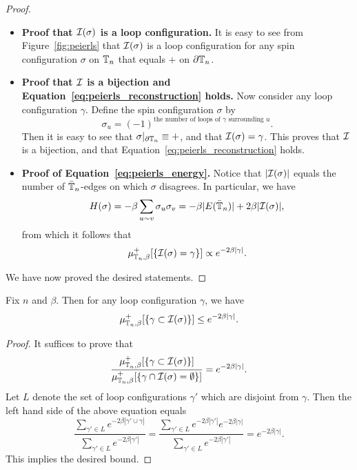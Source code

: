 \begin{proof}
    \begin{itemize}
        \item\textbf{Proof that $\mathcal I(\sigma)$ is a loop configuration.} It is easy to
            see from Figure~\ref{fig:peierls} that $\mathcal I(\sigma)$
            is a loop configuration for any spin configuration $\sigma$ on $\mathbb T_n$
            that equals $+$ on $\partial\mathbb T_n$.
        \item\textbf{Proof that $\mathcal I$ is a bijection and
            Equation~\eqref{eq:peierls_reconstruction} holds.}
            Now consider any loop configuration $\gamma$.
            Define the spin configuration $\sigma$ by
            \[
                \sigma_u = (-1)^{\text{the number of loops of $\gamma$ surrounding $u$}}.
            \]
            Then it is easy to see that $\sigma|_{\partial\mathbb T_n}\equiv +$,
            and that $\mathcal I(\sigma)=\gamma$.
            This proves that $\mathcal I$ is a bijection, and that
            Equation~\eqref{eq:peierls_reconstruction} holds.
        \item\textbf{Proof of Equation~\eqref{eq:peierls_energy}.}
            Notice that $|\mathcal I(\sigma)|$ equals the number of $\bar{\mathbb T}_n$-edges
            on which $\sigma$ disagrees.
            In particular, we have
            \[
                H(\sigma)=-\beta\sum_{u\sim v}\sigma_u\sigma_v=
                -\beta|E(\bar{\mathbb T}_n)| + 2\beta|\mathcal I(\sigma)|,
            \]
            from which it follows that
            \[
                \mu_{\mathbb T_n,\beta}^+[\{\mathcal I(\sigma)=\gamma\}]\propto
                e^{-2\beta|\gamma|}.
            \]
    \end{itemize}
    We have now proved the desired statements.
\end{proof}

\begin{lemma}
    \label{lemma:Peierls_loop_energy}
    Fix $n$ and $\beta$.
    Then for any loop configuration $\gamma$, we have
    \[
        \mu_{\mathbb T_n,\beta}^+[\{\gamma\subset\mathcal I(\sigma)\}]\leq e^{-2\beta|\gamma|}.
    \]
\end{lemma}

\begin{proof}
    It suffices to prove that
    \[
        \frac{
            \mu_{\mathbb T_n,\beta}^+[\{\gamma\subset\mathcal I(\sigma)\}]
        }
        {
            \mu_{\mathbb T_n,\beta}^+[\{\gamma\cap\mathcal I(\sigma)=\emptyset\}]
        }
        = e^{-2\beta|\gamma|}.
    \]
    Let $L$ denote the set of loop configurations $\gamma'$ which are disjoint from $\gamma$.
    Then the left hand side of the above equation equals
    \[
        \frac{
            \sum_{\gamma'\in L} e^{-2\beta|\gamma'\cup\gamma|}
        }
        {
            \sum_{\gamma'\in L} e^{-2\beta|\gamma'|}
        }
        =
        \frac{
            \sum_{\gamma'\in L} e^{-2\beta|\gamma'|}e^{-2\beta|\gamma|}
        }
        {
            \sum_{\gamma'\in L} e^{-2\beta|\gamma'|}
        }
        =
        e^{-2\beta|\gamma|}.
    \]
    This implies the desired bound.
\end{proof}

